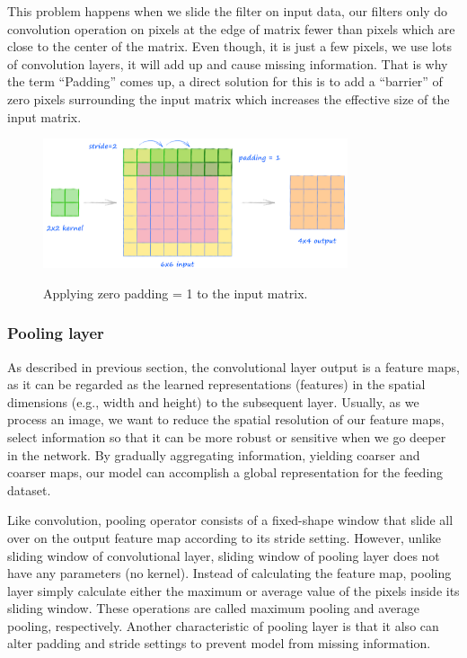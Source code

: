	This problem happens when we slide the filter on input data, our filters only do convolution operation on pixels at the edge of matrix fewer than pixels which are close to the center of the matrix. Even though, it is just a few pixels, we use lots of convolution layers, it will add up and cause missing information. That is why the term “Padding” comes up, a direct solution for this is to add a “barrier” of zero pixels surrounding the input matrix which increases the effective size of the input matrix.
	
	\begin{figure}[H]
		\centering
		{\includegraphics[width=0.8\textwidth]{./hinhanh/chap3/zero_padding.png}}
		\caption{Applying zero padding = 1 to the input matrix.}
		\label{fig:zero_padding}
	\end{figure}
	
\subsubsection{Pooling layer}
\label{subsubsection:poolinglayer}
\noindent

	As described in previous section, the convolutional layer output is a feature maps, as it can be regarded as the learned representations (features) in the spatial dimensions (e.g., width and height) to the subsequent layer. Usually, as we process an image, we want to reduce the spatial resolution of our feature maps, select information so that it can be more robust or sensitive when we go deeper in the network.  By gradually aggregating information, yielding coarser and coarser maps, our model can accomplish a global representation for the feeding dataset.
	
	Like convolution, pooling operator consists of a fixed-shape window that slide all over on the output feature map according to its stride setting. However, unlike sliding window of convolutional layer, sliding window of pooling layer does not have any parameters (no kernel). Instead of calculating the feature map, pooling layer simply calculate either the maximum or average value of the pixels inside its sliding window. These operations are called maximum pooling and average pooling, respectively. Another characteristic of  pooling layer is that it also can alter padding and stride settings to prevent model from missing information. 	
	
